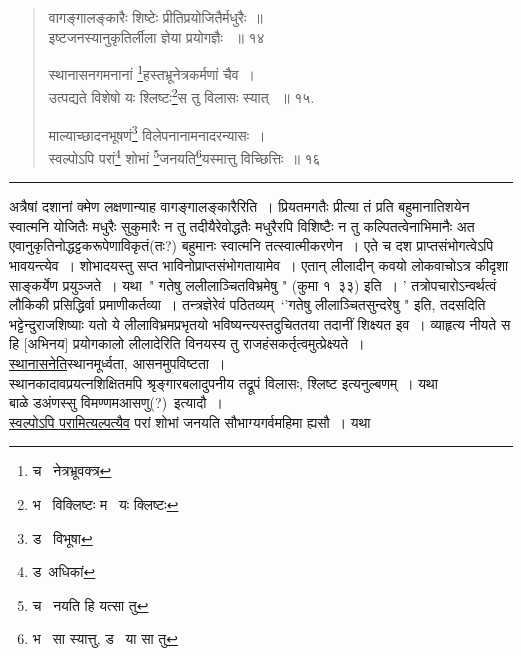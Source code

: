 \documentclass[11pt, openany]{book}
\begin{document}
\begin{quote}
 {\na वागङ्गालङ्कारैः शिष्टेः प्रीतिप्रयोजितैर्मधुरैः~॥ \\
 इष्टजनस्यानुकृतिर्लीला ज्ञेया प्रयोगज्ञैः ~॥ १४ 

 स्थानासनगमनानां \renewcommand{\thefootnote}{1}\footnote{च \textendash\ नेत्रभ्रूवक्त्र}हस्तभ्रूनेत्रकर्मणां चैव~।\\ 
 उत्पद्यते विशेषो यः श्लिष्टः\renewcommand{\thefootnote}{2}\footnote{भ \textendash\ विक्लिष्टः म \textendash\ यः क्लिष्टः}स तु विलासः स्यात् ~॥ १५. 

 माल्याच्छादनभूषणं\renewcommand{\thefootnote}{3}\footnote{ड \textendash\ विभूषा} विलेपनानामनादरन्यासः~।\\ 
 स्वल्पोऽपि परां\renewcommand{\thefootnote}{4}\footnote{ड\textendash\ अधिकां} शोभां \renewcommand{\thefootnote}{5}\footnote{च \textendash\ नयति हि यत्सा तु}जनयति\renewcommand{\thefootnote}{6}\footnote{भ \textendash\ सा स्यात्तु, ड \textendash\ या सा तु}यस्मात्तु विच्छित्तिः~॥ १६ } 
\end{quote}
 
\hrule

\vspace{2mm}
अत्रैषां दशानां क्मेण लक्षणान्याह वागङ्गालङ्कारैरिति~। प्रियतमगतैः प्रीत्या तं प्रति बहुमानातिशयेन स्वात्मनि योजितैः मधुरैः सुकुमारैः न तु तदीयैरेवोद्धतैः मधुरैरपि विशिष्टैः न तु कल्पितत्वेनाभिमानैः अत एवानुकृतिनोद्धट्टकरूपेणाविकृतं(तः?) बहुमानः स्वात्मनि तत्स्वात्मीकरणेन~। एते च दश प्राप्तसंभोगत्वेऽपि भावयन्त्येव~। शोभादयस्तु सप्त भाविनोप्राप्तसंभोगतायामेव~। एतान् लीलादीन् कवयो लोकवाचोऽत्र कीदृशा साङ्कर्येण प्रयुञ्जते~। यथा\textendash\ " गतेषु ललीलाञ्चितविभ्रमेषु " (कुमा १\textendash\ ३३) इति~। ' तत्रोपचारोऽन्वर्थत्वं लौकिकी प्रसिद्धिर्वा प्रमाणीकर्तव्या~। तन्त्रज्ञेरेवं पठितव्यम्\textendash\ `'गतेषु लीलाञ्चितसुन्दरेषु " इति, तदसदिति भट्टेन्दुराजशिष्याः यतो ये लीलाविभ्रमप्रभृतयो भविष्यन्त्यस्तदुचिततया तदानीं शिक्ष्यत इव~। व्याहृत्य नीयते स हि [अभिनय] प्रयोगकालो लीलादेरिति विनयस्य तु राजहंसकर्तृत्वमुत्प्रेक्ष्यते~। \\

\underline{स्थानासनेति}स्थानमूर्ध्वता, आसनमुपविष्टता~।\\

स्थानकादावप्रयत्नशिक्षितमपि श्रृङ्गारबलादुपनीय तद्रूपं विलासः, श्लिष्ट इत्यनुल्बणम्~। यथा\textendash\ \\ 

बाळे डअंणस्सु विमण्णमआसणु(?)\textendash\ इत्यादौ~। \\

\underline{स्वल्पोऽपि परामित्यल्पत्यैव} परां शोभां जनयति सौभाग्यगर्वमहिमा ह्यसौ~। यथा\textendash\ 
\end{document}
